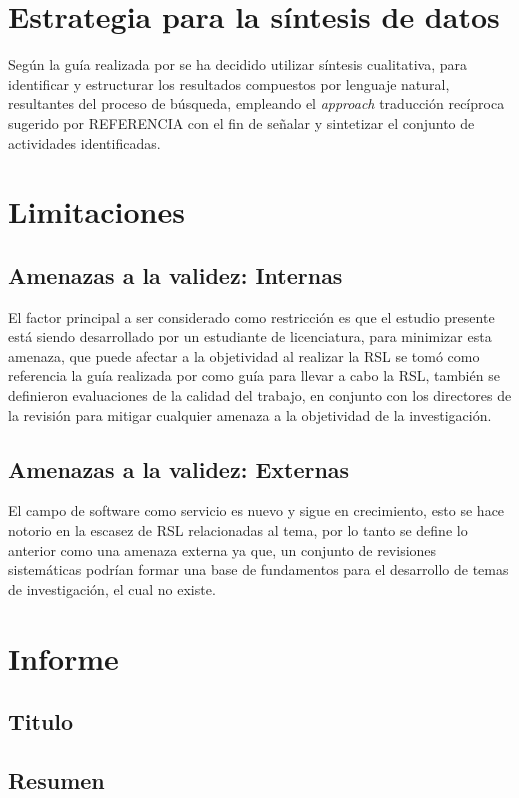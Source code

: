\documentclass{article}
\begin{document}
\section{Estrategia para la síntesis de datos}
Según la guía realizada por \cite{kitchenham2007guidelines} se ha decidido utilizar síntesis cualitativa, para identificar y estructurar los resultados compuestos por 
lenguaje natural, resultantes del proceso de búsqueda, empleando el \emph{approach} traducción recíproca sugerido por REFERENCIA con el fin de señalar 
y sintetizar el conjunto de actividades identificadas.
\newpage

\section{Limitaciones}
\subsection{Amenazas a la validez: Internas}
El factor principal a ser considerado como restricción es que el estudio presente está siendo 
desarrollado por un estudiante de licenciatura, para minimizar esta amenaza, que puede afectar a la objetividad 
al realizar la RSL se tomó como referencia la guía realizada por \cite{kitchenham2007guidelines}
como guía para llevar a cabo la RSL, también se definieron evaluaciones de la calidad del trabajo, en conjunto 
con los directores de la revisión para mitigar cualquier amenaza a la objetividad de la investigación. 

\subsection{Amenazas a la validez: Externas}
El campo de software como servicio es nuevo y sigue en crecimiento, esto se hace notorio en la escasez de 
RSL relacionadas al tema, por lo tanto se define lo anterior como  una amenaza externa ya que, un conjunto 
de revisiones sistemáticas podrían formar una base de fundamentos para el desarrollo de temas de investigación, el cual no existe.
\newpage


\section{Informe}
\subsection{Titulo}
\subsection{Resumen}
\end{document}
